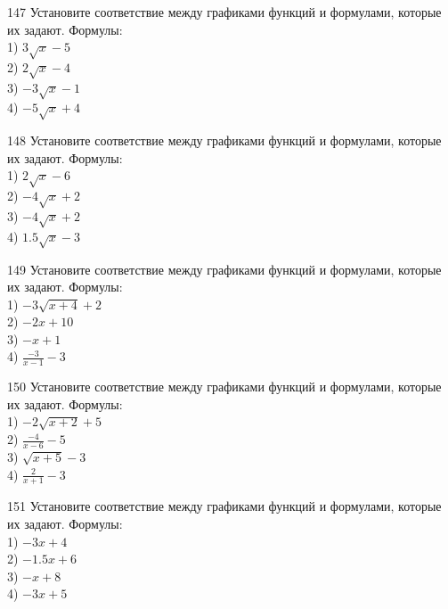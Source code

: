 \documentclass[4apaper]{article}
\begin{document}
\begin{taskBN}{147}
Установите соответствие между графиками функций и формулами, которые их задают. Формулы: \\1) $3\sqrt{x}-5$\\2) $2\sqrt{x}-4$\\3) $-3\sqrt{x}-1$\\4) $-5\sqrt{x}+4$
\end{taskBN}

\begin{taskBN}{148}
Установите соответствие между графиками функций и формулами, которые их задают. Формулы: \\1) $2\sqrt{x}-6$\\2) $-4\sqrt{x}+2$\\3) $-4\sqrt{x}+2$\\4) $1.5\sqrt{x}-3$
\end{taskBN}

\begin{taskBN}{149}
Установите соответствие между графиками функций и формулами, которые их задают. Формулы: \\1) $-3\sqrt{x+4}+2$\\2) $-2x+10$\\3) $-x+1$\\4) $\frac{-3}{x-1}-3$
\end{taskBN}

\begin{taskBN}{150}
Установите соответствие между графиками функций и формулами, которые их задают. Формулы: \\1) $-2\sqrt{x+2}+5$\\2) $\frac{-4}{x-6}-5$\\3) $\sqrt{x+5}-3$\\4) $\frac{2}{x+1}-3$
\end{taskBN}

\begin{taskBN}{151}
Установите соответствие между графиками функций и формулами, которые их задают. Формулы: \\1) $-3x+4$\\2) $-1.5x+6$\\3) $-x+8$\\4) $-3x+5$
\end{taskBN}
\end{document}

